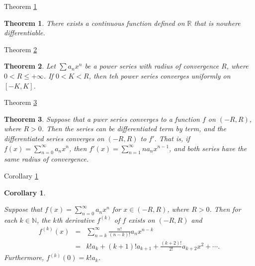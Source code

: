 \documentclass[avery5371,grid]{flashcards}
\newtheorem{corollary}{Corollary}
\newtheorem{theorem}{Theorem}
\newcommand{\bb}[1]{\mathbb{#1}}
\newcommand{\R}{\bb{R}}
\newcommand{\N}{\bb{N}}
\begin{document}
\begin{flashcard}[Theorem]{Theorem \ref{thm120}}
\begin{theorem}
\label{thm120}
There exists a continuous function defined on $\R$ that is
nowhere differentiable.
\end{theorem} 
\end{flashcard}

\begin{flashcard}[Theorem]{Theorem \ref{thm121}}
\begin{theorem}
\label{thm121}
Let $\displaystyle \sum a_n x^n$ be a power series with radius
of convergence $R$, where $0< R \leq + \infty$.  If $0<K<R$, then teh power
series converges uniformly on $[-K,K]$.
\end{theorem}
\end{flashcard}

\begin{flashcard}[Theorem]{Theorem \ref{thm122}}
\begin{theorem}
\label{thm122}
Suppose that a pwer series converges to a function $f$ on
$(-R,R)$, where $R>0$.  Then the series can be differentiated term by term, and
the differentiated series converges on $(-R,R)$ to $f'$.  That is, if $f(x) =
\displaystyle \sum _{n=0}^{\infty} a_nx^n$, then $f'(x) = \displaystyle \sum
_{n=1}^{\infty} na_nx^{n-1}$, and both series have the same radius of
convergence.
\end{theorem}
\end{flashcard}

\begin{flashcard}[Corollary]{Corollary \ref{cor11}}
\begin{corollary}
\label{cor11}
\begin{small}
Suppose that $f(x) = \displaystyle \sum _{n=0}^{\infty}
a_nx^n$ for $x \in (-R,R)$, where $R>0$.  Then for each $k \in \N$, the $k$th
derivative $f^{(k)}$ of $f$ exists on $(-R,R)$ and 
\begin{eqnarray*}
f^{(k)}(x) & = & \sum _{n=k}^{\infty} \frac{n!}{(n-k)!}a_nx^{n-k} \\
 & = & k! a_k + (k+1)!a_{k+1} + \frac{(k+2)!}{2!}a_{k+2}x^2 + \cdots .
\end{eqnarray*}
Furthermore, $f^{(k)}(0) = k!a_k$.
\end{small}
\end{corollary}
\end{flashcard}
\end{document}
